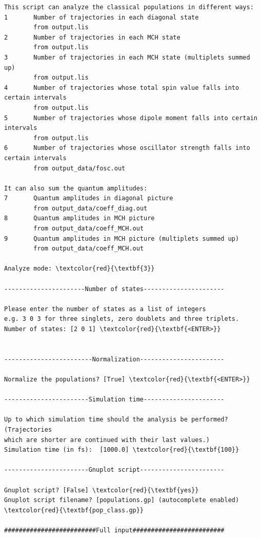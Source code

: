 \documentclass[a4paper,11pt,DIV=15,openany]{scrbook}
\begin{document}
\begin{oframed}
\begin{Verbatim}[commandchars=\\\{\}]
This script can analyze the classical populations in different ways:
1       Number of trajectories in each diagonal state                                   
        from output.lis
2       Number of trajectories in each MCH state                                        
        from output.lis
3       Number of trajectories in each MCH state (multiplets summed up)                 
        from output.lis
4       Number of trajectories whose total spin value falls into certain intervals      
        from output.lis
5       Number of trajectories whose dipole moment falls into certain intervals         
        from output.lis
6       Number of trajectories whose oscillator strength falls into certain intervals   
        from output_data/fosc.out

It can also sum the quantum amplitudes:
7       Quantum amplitudes in diagonal picture                                          
        from output_data/coeff_diag.out
8       Quantum amplitudes in MCH picture                                               
        from output_data/coeff_MCH.out
9       Quantum amplitudes in MCH picture (multiplets summed up)                        
        from output_data/coeff_MCH.out

Analyze mode: \textcolor{red}{\textbf{3}}

----------------------Number of states----------------------

Please enter the number of states as a list of integers
e.g. 3 0 3 for three singlets, zero doublets and three triplets.
Number of states: [2 0 1] \textcolor{red}{\textbf{<ENTER>}}


------------------------Normalization-----------------------

Normalize the populations? [True] \textcolor{red}{\textbf{<ENTER>}}

-----------------------Simulation time----------------------

Up to which simulation time should the analysis be performed? (Trajectories 
which are shorter are continued with their last values.)
Simulation time (in fs):  [1000.0] \textcolor{red}{\textbf{100}}

-----------------------Gnuplot script-----------------------

Gnuplot script? [False] \textcolor{red}{\textbf{yes}}
Gnuplot script filename? [populations.gp] (autocomplete enabled) \textcolor{red}{\textbf{pop_class.gp}}

#########################Full input#########################


\end{Verbatim}
\end{oframed}
\end{document}
